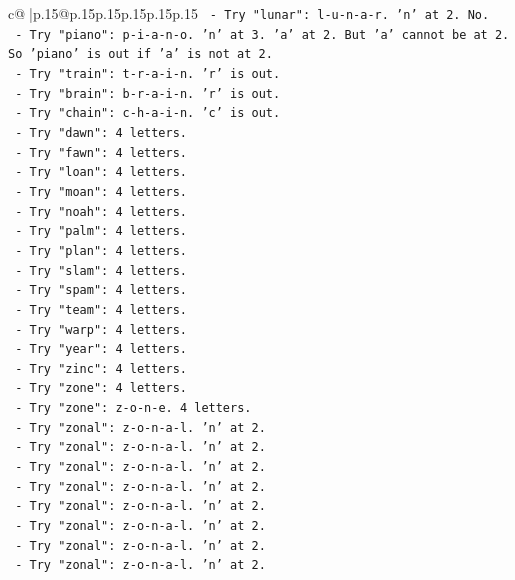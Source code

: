 \documentclass{article}
\begin{document}
{\begin{supertabular}{c@{$\;$}|p{.15\linewidth}@{}p{.15\linewidth}p{.15\linewidth}p{.15\linewidth}p{.15\linewidth}p{.15\linewidth}}
{{{\texttt{   {-} Try "lunar": l{-}u{-}n{-}a{-}r. 'n' at 2. No.} \\
\texttt{   {-} Try "piano": p{-}i{-}a{-}n{-}o. 'n' at 3. 'a' at 2. But 'a' cannot be at 2. So 'piano' is out if 'a' is not at 2.} \\
\texttt{   {-} Try "train": t{-}r{-}a{-}i{-}n. 'r' is out.} \\
\texttt{   {-} Try "brain": b{-}r{-}a{-}i{-}n. 'r' is out.} \\
\texttt{   {-} Try "chain": c{-}h{-}a{-}i{-}n. 'c' is out.} \\
\texttt{   {-} Try "dawn": 4 letters.} \\
\texttt{   {-} Try "fawn": 4 letters.} \\
\texttt{   {-} Try "loan": 4 letters.} \\
\texttt{   {-} Try "moan": 4 letters.} \\
\texttt{   {-} Try "noah": 4 letters.} \\
\texttt{   {-} Try "palm": 4 letters.} \\
\texttt{   {-} Try "plan": 4 letters.} \\
\texttt{   {-} Try "slam": 4 letters.} \\
\texttt{   {-} Try "spam": 4 letters.} \\
\texttt{   {-} Try "team": 4 letters.} \\
\texttt{   {-} Try "warp": 4 letters.} \\
\texttt{   {-} Try "year": 4 letters.} \\
\texttt{   {-} Try "zinc": 4 letters.} \\
\texttt{   {-} Try "zone": 4 letters.} \\
\texttt{   {-} Try "zone": z{-}o{-}n{-}e. 4 letters.} \\
\texttt{   {-} Try "zonal": z{-}o{-}n{-}a{-}l. 'n' at 2.} \\
\texttt{   {-} Try "zonal": z{-}o{-}n{-}a{-}l. 'n' at 2.} \\
\texttt{   {-} Try "zonal": z{-}o{-}n{-}a{-}l. 'n' at 2.} \\
\texttt{   {-} Try "zonal": z{-}o{-}n{-}a{-}l. 'n' at 2.} \\
\texttt{   {-} Try "zonal": z{-}o{-}n{-}a{-}l. 'n' at 2.} \\
\texttt{   {-} Try "zonal": z{-}o{-}n{-}a{-}l. 'n' at 2.} \\
\texttt{   {-} Try "zonal": z{-}o{-}n{-}a{-}l. 'n' at 2.} \\
\texttt{   {-} Try "zonal": z{-}o{-}n{-}a{-}l. 'n' at 2.} \\
}}}
\end{supertabular}}
\end{document}
